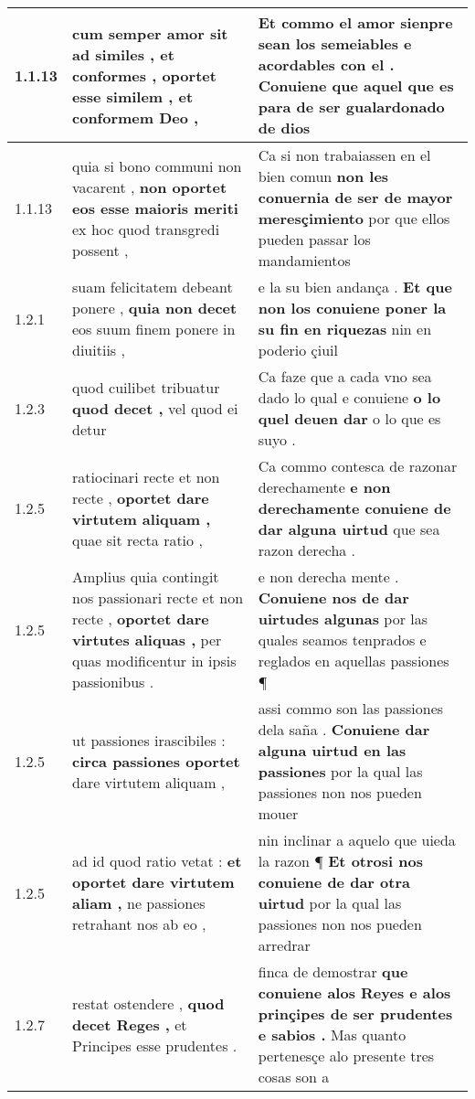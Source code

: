 \begin{tabular}{|p{1cm}|p{6.5cm}|p{6.5cm}|}
1.1.13 & cum semper amor sit ad similes , et conformes , \textbf{ oportet esse similem , } et conformem Deo , & Et commo el amor sienpre sean los semeiables e acordables con el . \textbf{ Conuiene que aquel que es para de ser } gualardonado de dios \\\hline
1.1.13 & quia si bono communi non vacarent , \textbf{ non oportet eos esse maioris meriti } ex hoc quod transgredi possent , & Ca si non trabaiassen en el bien comun \textbf{ non les conuernia de ser de mayor meresçimiento } por que ellos pueden passar los mandamientos \\\hline
1.2.1 & suam felicitatem debeant ponere , \textbf{ quia non decet } eos suum finem ponere in diuitiis , & e la su bien andança . \textbf{ Et que non los conuiene poner la su fin en riquezas } nin en poderio çiuil \\\hline
1.2.3 & quod cuilibet tribuatur \textbf{ quod decet , } vel quod ei detur & Ca faze que a cada vno sea dado lo qual e conuiene \textbf{ o lo quel deuen dar } o lo que es suyo . \\\hline
1.2.5 & ratiocinari recte et non recte , \textbf{ oportet dare virtutem aliquam , } quae sit recta ratio , & Ca commo contesca de razonar derechamente \textbf{ e non derechamente conuiene de dar alguna uirtud } que sea razon derecha . \\\hline
1.2.5 & Amplius quia contingit nos passionari recte et non recte , \textbf{ oportet dare virtutes aliquas , } per quas modificentur in ipsis passionibus . & e non derecha mente . \textbf{ Conuiene nos de dar uirtudes algunas } por las quales seamos tenprados e reglados en aquellas passiones ¶ \\\hline
1.2.5 & ut passiones irascibiles : \textbf{ circa passiones oportet } dare virtutem aliquam , & assi commo son las passiones dela saña . \textbf{ Conuiene dar alguna uirtud en las passiones } por la qual las passiones non nos pueden mouer \\\hline
1.2.5 & ad id quod ratio vetat : \textbf{ et oportet dare virtutem aliam , } ne passiones retrahant nos ab eo , & nin inclinar a aquelo que uieda la razon ¶ \textbf{ Et otrosi nos conuiene de dar otra uirtud } por la qual las passiones non nos pueden arredrar \\\hline
1.2.7 & restat ostendere , \textbf{ quod decet Reges , } et Principes esse prudentes . & finca de demostrar \textbf{ que conuiene alos Reyes e alos prinçipes de ser prudentes e sabios . } Mas quanto pertenesçe alo presente tres cosas son a \\\hline

\end{tabular}
